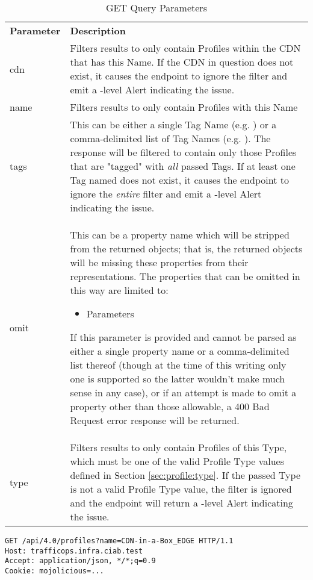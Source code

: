 \begin{table}[h]
\centering
\caption{GET  Query Parameters\label{tbl:profiles:get:qparams}}
\begin{tabularx}{\linewidth}{|l|X|}
	\hline
	\textbf{Parameter} & \textbf{Description}\\
	cdn & Filters results to only contain Profiles within the CDN that has this
		Name. If the CDN in question does not exist, it causes the endpoint to
		ignore the filter and emit a \code{warning}-level Alert indicating the
		issue.\\
	\hline
	name & Filters results to only contain Profiles with this Name\\
	\hline
	tags & This can be either a single Tag Name (e.g. \code{tags=Foo}) or a
		comma-delimited list of Tag Names (e.g. \code{tags=Foo,Bar}). The
		response will be filtered to contain only those Profiles that are
		"tagged" with \emph{all} passed Tags. If at least one Tag named does
		not exist, it causes the endpoint to ignore the \emph{entire} filter
		and emit a \code{warning}-level Alert indicating the issue.\\
	\hline
	omit & This can be a property name which will be stripped from the returned
		objects; that is, the returned objects will be missing these properties
		from their representations. The properties that can be omitted in this
		way are limited to:
		\begin{itemize}
			\item Parameters
		\end{itemize}
		If this parameter is provided and cannot be parsed as either a
		single property name or a comma-delimited list thereof (though at the
		time of this writing only one is supported so the latter wouldn't make
		much sense in any case), or if an attempt is made to omit a property
		other than those allowable, a 400 Bad Request error response will be
		returned.\\
	\hline
	type & Filters results to only contain Profiles of this Type, which must be
		one of the valid Profile Type values defined in Section
		\ref{sec:profile:type}. If the passed Type is not a valid Profile Type
		value, the filter is ignored and the endpoint will return a
		\code{warning}-level Alert indicating the issue.\\
	\hline
\end{tabularx}
\end{table}

\begin{codelisting}
\begin{verbatim}
GET /api/4.0/profiles?name=CDN-in-a-Box_EDGE HTTP/1.1
Host: trafficops.infra.ciab.test
Accept: application/json, */*;q=0.9
Cookie: mojolicious=...

\end{verbatim}
\end{codelisting}

